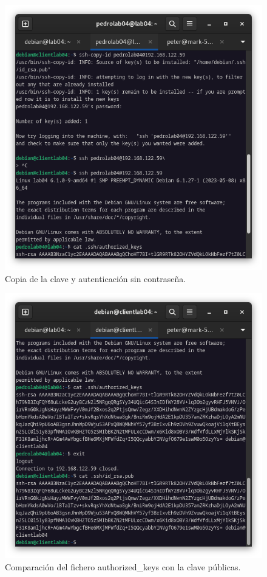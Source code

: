 \begin{figure}[H]
	\centering
	\includegraphics[scale=0.40]{07}
	\caption{Copia de la clave y autenticación sin contraseña.}
\end{figure}

\begin{figure}[H]
	\centering
	\includegraphics[scale=0.40]{08}
	\caption{Comparación del fichero authorized\_keys con la clave públicas.}
\end{figure}

